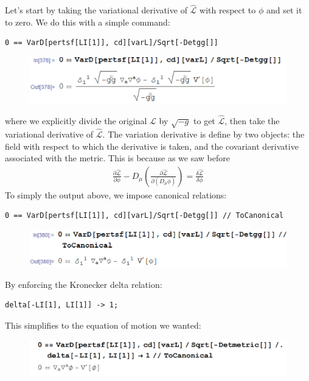 \documentclass{book}
\theoremstyle{definition}
\newcommand{\p}{\partial}
\newcommand{\lag}{\mathcal{L}}
\newcommand{\f}[2]{\frac{#1}{#2}}
\newcommand{\lp}{\left(}
\newcommand{\rp}{\right)}
\begin{document}
Let's start by taking the variational derivative of $\hat{\lag}$ with respect to $\phi$ and set it to zero. We do this with a simple command:
\begin{lstlisting}
0 == VarD[pertsf[LI[1]], cd][varL]/Sqrt[-Detgg[]]
\end{lstlisting}
\begin{figure}[!htb]
	\includegraphics[scale=0.25]{varDivL1}
\end{figure}
where we explicitly divide the original $\lag$ by $\sqrt{-g}$ to get $\hat{\lag}$, then take the variational derivative of $\hat{\lag}$. The variation derivative is define by two objects: the field with respect to which the derivative is taken, and the covariant derivative associated with the metric. This is because as we saw before
\begin{align}
\boxed{\f{\p \hat{\lag}}{\p \phi} - D_\mu \lp \f{\p \hat{\lag}}{\p(D_\mu \phi)} \rp = \f{\delta \hat{\lag}}{\delta \phi}}
\end{align}
To simply the output above, we impose canonical relations:
\begin{lstlisting}
0 == VarD[pertsf[LI[1]], cd][varL]/Sqrt[-Detgg[]] // ToCanonical
\end{lstlisting}
\begin{figure}[!htb]
	\includegraphics[scale=0.25]{varDivL2}
\end{figure}
By enforcing the Kronecker delta relation:
\begin{lstlisting}
delta[-LI[1], LI[1]] -> 1;
\end{lstlisting}
This simplifies to the equation of motion we wanted:
\begin{figure}[!htb]
	\includegraphics[scale=0.25]{varDivL3}
\end{figure}\\
\end{document}
